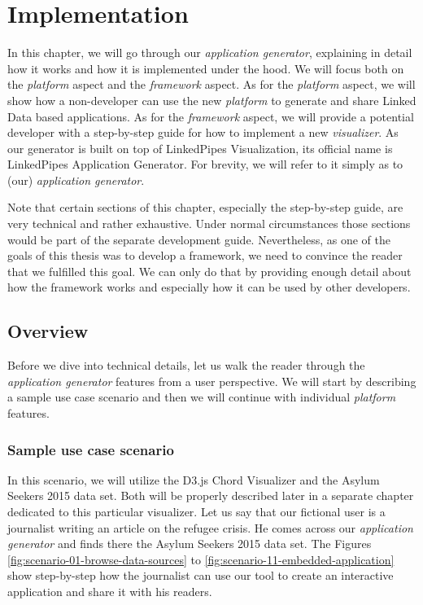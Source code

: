\chapter{Implementation}
\label{chap:implementation}

In this chapter, we will go through our \emph{application generator}, explaining in detail how it works and how it is implemented under the hood. We will focus both on the \emph{platform} aspect and the \emph{framework} aspect. As for the \emph{platform} aspect, we will show how a non-developer can use the new \emph{platform} to generate and share Linked Data based applications. As for the \emph{framework} aspect, we will provide a potential developer with a step-by-step guide for how to implement a new \emph{visualizer}. As our generator is built on top of LinkedPipes Visualization, its official name is LinkedPipes Application Generator. For brevity, we will refer to it simply as to (our) \emph{application generator}.

Note that certain sections of this chapter, especially the step-by-step guide, are very technical and rather exhaustive. Under normal circumstances those sections would be part of the separate development guide. Nevertheless, as one of the goals of this thesis was to develop a framework, we need to convince the reader that we fulfilled this goal. We can only do that by providing enough detail about how the framework works and especially how it can be used by other developers.

\section{Overview}

Before we dive into technical details, let us walk the reader through the \emph{application generator} features from a user perspective. We will start by describing a sample use case scenario and then we will continue with individual \emph{platform} features.

\subsection{Sample use case scenario}
\label{sec:implementation:use-case-scenario}

In this scenario, we will utilize the D3.js Chord Visualizer and the Asylum Seekers 2015 data set. Both will be properly described later in a separate chapter dedicated to this particular visualizer. Let us say that our fictional user is a journalist writing an article on the refugee crisis. He comes across our \emph{application generator} and finds there the Asylum Seekers 2015 data set. The Figures \ref{fig:scenario-01-browse-data-sources} to \ref{fig:scenario-11-embedded-application} show step-by-step how the journalist can use our tool to create an interactive application and share it with his readers. 

